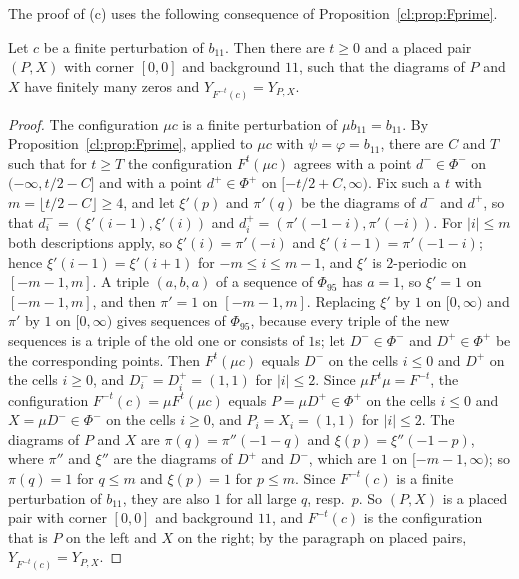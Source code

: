 The proof of (c) uses the following consequence of Proposition~\ref{cl:prop:Fprime}.

\begin{lemma}\label{cl:lem:95in}
Let $c$ be a finite perturbation of $b_{11}$. Then there are $t\ge0$ and a placed pair $(P,X)$ with corner $[0,0]$ and background $11$, such that the diagrams of $P$ and $X$ have finitely many zeros and $Y_{F^{-t}(c)}=Y_{P,X}$.
\end{lemma}

\begin{proof}
The configuration $\mu c$ is a finite perturbation of $\mu b_{11}=b_{11}$. By Proposition~\ref{cl:prop:Fprime}, applied to $\mu c$ with $\psi=\varphi=b_{11}$, there are $C$ and $T$ such that for $t\ge T$ the configuration $F^t(\mu c)$ agrees with a point $d^-\in\Phi^-$ on $(-\infty,t/2-C]$ and with a point $d^+\in\Phi^+$ on $[-t/2+C,\infty)$. Fix such a $t$ with $m=\lfloor t/2-C\rfloor\ge4$, and let $\xi'(p)$ and $\pi'(q)$ be the diagrams of $d^-$ and $d^+$, so that $d^-_i=(\xi'(i-1),\xi'(i))$ and $d^+_i=(\pi'(-1-i),\pi'(-i))$. For $|i|\le m$ both descriptions apply, so $\xi'(i)=\pi'(-i)$ and $\xi'(i-1)=\pi'(-1-i)$; hence $\xi'(i-1)=\xi'(i+1)$ for $-m\le i\le m-1$, and $\xi'$ is $2$-periodic on $[-m-1,m]$. A triple $(a,b,a)$ of a sequence of $\Phi_{95}$ has $a=1$, so $\xi'=1$ on $[-m-1,m]$, and then $\pi'=1$ on $[-m-1,m]$. Replacing $\xi'$ by $1$ on $[0,\infty)$ and $\pi'$ by $1$ on $[0,\infty)$ gives sequences of $\Phi_{95}$, because every triple of the new sequences is a triple of the old one or consists of $1$s; let $D^-\in\Phi^-$ and $D^+\in\Phi^+$ be the corresponding points. Then $F^t(\mu c)$ equals $D^-$ on the cells $i\le0$ and $D^+$ on the cells $i\ge0$, and $D^-_i=D^+_i=(1,1)$ for $|i|\le2$. Since $\mu F^t\mu=F^{-t}$, the configuration $F^{-t}(c)=\mu F^t(\mu c)$ equals $P=\mu D^+\in\Phi^+$ on the cells $i\le0$ and $X=\mu D^-\in\Phi^-$ on the cells $i\ge0$, and $P_i=X_i=(1,1)$ for $|i|\le2$. The diagrams of $P$ and $X$ are $\pi(q)=\pi''(-1-q)$ and $\xi(p)=\xi''(-1-p)$, where $\pi''$ and $\xi''$ are the diagrams of $D^+$ and $D^-$, which are $1$ on $[-m-1,\infty)$; so $\pi(q)=1$ for $q\le m$ and $\xi(p)=1$ for $p\le m$. Since $F^{-t}(c)$ is a finite perturbation of $b_{11}$, they are also $1$ for all large $q$, resp.\ $p$. So $(P,X)$ is a placed pair with corner $[0,0]$ and background $11$, and $F^{-t}(c)$ is the configuration that is $P$ on the left and $X$ on the right; by the paragraph on placed pairs, $Y_{F^{-t}(c)}=Y_{P,X}$.
\end{proof}

